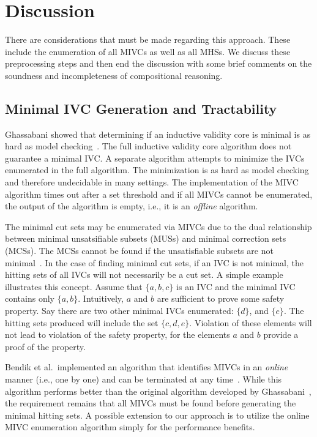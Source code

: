 \section{Discussion}
\label{sec:disc}
There are considerations that must be made regarding this approach. These include the enumeration of all MIVCs as well as all MHSs. We discuss these preprocessing steps and then end the discussion with some brief comments on the soundness and incompleteness of compositional reasoning. 

\subsection{Minimal IVC Generation and Tractability}
Ghassabani showed that determining if an inductive validity core is minimal is as hard as model checking~\cite{ghassabani_2018, Ghassabani2017EfficientGO}. The full inductive validity core algorithm does not guarantee a minimal IVC. A separate algorithm attempts to minimize the IVCs enumerated in the full algorithm. The minimization is as hard as model checking and therefore undecidable in many settings. The implementation of the MIVC algorithm times out after a set threshold and if all MIVCs cannot be enumerated, the output of the algorithm is empty, i.e., it is an {\em offline} algorithm. 

The minimal cut sets may be enumerated via MIVCs due to the dual relationship between minimal unsatsifiable subsets (MUSs) and minimal correction sets (MCSs). The MCSs cannot be found if the unsatisfiable subsets are not minimal~\cite{liffiton2016fast}. In the case of finding minimal cut sets, if an IVC is not minimal, the hitting sets of all IVCs will not necessarily be a cut set. A simple example illustrates this concept. Assume that $\{a,b,c\}$ is an IVC and the minimal IVC contains only $\{a,b\}$. Intuitively, $a$ and $b$ are sufficient to prove some safety property. Say there are two other minimal IVCs enumerated: $\{d\}$, and $\{e\}$.  The hitting sets produced will include the set $\{c, d, e\}$. Violation of these elements will not lead to violation of the safety property, for the elements $a$ and $b$ provide a proof of the property. 

Bendik et al.~implemented an algorithm that identifies MIVCs in an {\em online} manner (i.e., one by one) and can be terminated at any time~\cite{bendik2018online}. While this algorithm performs better than the original \aivcalg algorithm developed by Ghassabani~\cite{Ghassabani2017EfficientGO}, the requirement remains that all MIVCs must be found before generating the minimal hitting sets. A possible extension to our approach is to utilize the online MIVC enumeration algorithm simply for the performance benefits. 

